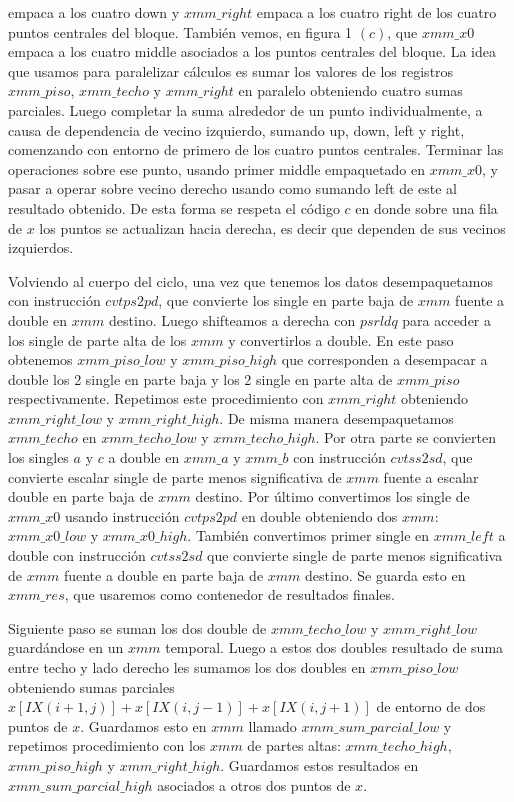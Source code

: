 empaca a los cuatro down y $xmm\_right$ empaca a los cuatro right de los cuatro puntos centrales del bloque. También vemos, en figura 1 $(c)$, que $xmm\_x0$ empaca a los cuatro middle asociados a los puntos centrales del bloque.
La idea que usamos para paralelizar cálculos es sumar los valores de los registros $xmm\_piso$,
$xmm\_techo$ y $xmm\_right$ en paralelo obteniendo cuatro sumas parciales.
Luego completar la suma alrededor de un punto individualmente, a causa de dependencia de vecino izquierdo, sumando up, down, left y right, comenzando con entorno de primero de los cuatro puntos centrales. Terminar las operaciones sobre ese punto, usando primer middle empaquetado en $xmm\_x0$, y pasar a operar sobre vecino derecho usando como sumando left de este al resultado obtenido.
De esta forma se respeta el código $c$ en donde sobre una fila de $x$ los 
puntos se actualizan hacia derecha, es decir que dependen de sus vecinos izquierdos.\newline
  
\par Volviendo al cuerpo del ciclo, una vez que tenemos los datos desempaquetamos con instrucción $cvtps2pd$, que convierte los single en parte baja de $xmm$ fuente a double en $xmm$ destino. Luego shifteamos a derecha con $psrldq$ para acceder a los single de parte alta de los $xmm$ y convertirlos a double. En este paso obtenemos $xmm\_piso\_low$ y $xmm\_piso\_high$ que corresponden a desempacar a double los 2 single en parte baja y los 2 single en parte alta de $xmm\_piso$ respectivamente.
Repetimos este procedimiento con $xmm\_right$ obteniendo $xmm\_right\_low$ y $xmm\_right\_high$. De misma manera desempaquetamos $xmm\_techo$ en $xmm\_techo\_low$ y $xmm\_techo\_high$.
Por otra parte se convierten los singles $a$ y $c$ a double en $xmm\_a$ y $xmm\_b$ con instrucción
$cvtss2sd$, que convierte escalar single de parte menos significativa de $xmm$ fuente a
escalar double en parte baja de $xmm$ destino. 
Por último convertimos los single de $xmm\_x0$ usando instrucción $cvtps2pd$ en double obteniendo dos
$xmm$: $xmm\_x0\_low$ y $xmm\_x0\_high$. También convertimos primer single en $xmm\_left$ a double con instrucción $cvtss2sd$ que convierte single de parte menos significativa de $xmm$ fuente a double en parte baja de $xmm$ destino. Se guarda esto en $xmm\_res$, que usaremos como contenedor de resultados finales.\newline

\par Siguiente paso se suman los dos double de $xmm\_techo\_low$ y $xmm\_right\_low$ guardándose en un $ xmm$ temporal. 
Luego a estos dos doubles resultado de suma entre techo y lado derecho les sumamos los dos doubles
en $xmm\_piso\_low$ obteniendo sumas parciales $x[IX(i+1,j)]+x[IX(i,j-1)]+x[IX(i,j+1)]$ de entorno de dos puntos de $x$.
Guardamos esto en $xmm$ llamado $xmm\_sum\_parcial\_low$ y repetimos procedimiento con los $xmm$
de partes altas: $xmm\_techo\_high$, $xmm\_piso\_high$ y $xmm\_right\_high$. Guardamos
estos resultados en $xmm\_sum\_parcial\_high$ asociados a otros dos puntos de $x$.\newline

